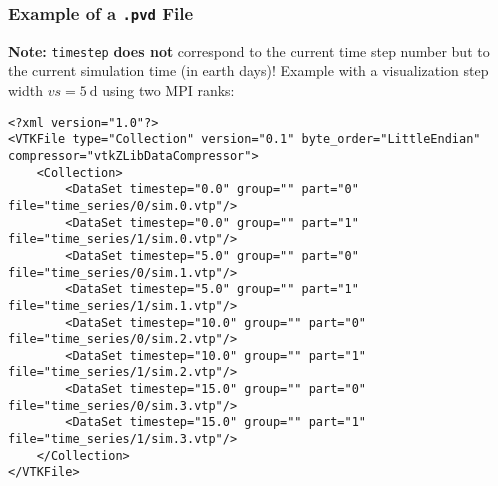 \begin{frame}[fragile]
  \frametitle{Example of a \texttt{.pvd} File}
  \textbf{Note:} \texttt{timestep} \textbf{does not} correspond to the current time step number but to the current simulation time (in earth days)!
  \vfill
  Example with a visualization step width $vs = \SI{5}{\day}$ using two MPI ranks:
  \setfontsize{7.2pt}
  \begin{verbatim}
<?xml version="1.0"?>
<VTKFile type="Collection" version="0.1" byte_order="LittleEndian" compressor="vtkZLibDataCompressor">
	<Collection>
		<DataSet timestep="0.0" group="" part="0" file="time_series/0/sim.0.vtp"/>
		<DataSet timestep="0.0" group="" part="1" file="time_series/1/sim.0.vtp"/>
		<DataSet timestep="5.0" group="" part="0" file="time_series/0/sim.1.vtp"/>
		<DataSet timestep="5.0" group="" part="1" file="time_series/1/sim.1.vtp"/>
		<DataSet timestep="10.0" group="" part="0" file="time_series/0/sim.2.vtp"/>
		<DataSet timestep="10.0" group="" part="1" file="time_series/1/sim.2.vtp"/>
		<DataSet timestep="15.0" group="" part="0" file="time_series/0/sim.3.vtp"/>
		<DataSet timestep="15.0" group="" part="1" file="time_series/1/sim.3.vtp"/>
	</Collection>
</VTKFile>
  \end{verbatim}
\end{frame}


